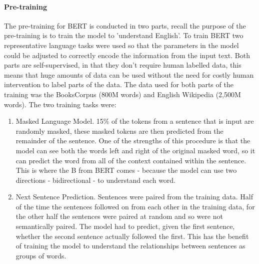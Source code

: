 \paragraph{Pre-training} The pre-training for BERT is conducted in two parts, recall the purpose of the pre-training is to train the model to 'understand English'. To train BERT two representative language tasks were used so that the parameters in the model could be adjusted to correctly encode the information from the input text. Both parts are self-supervised, in that they don't require human labelled data, this means that huge amounts of data can be used without the need for costly human intervention to label parts of the data. The data used for both parts of the training was the BooksCorpus (800M words) and English Wikipedia (2,500M words). The two training tasks were:

\begin{enumerate}
    \item Masked Language Model. 15\% of the tokens from a sentence that is input are randomly masked, these masked tokens are then predicted from the remainder of the sentence. One of the strengths of this procedure is that the model can see both the words left and right of the original masked word, so it can predict the word from all of the context contained within the sentence. This is where the B from BERT comes - because the model can use two directions - bidirectional - to understand each word. 
    
    \item Next Sentence Prediction. Sentences were paired from the training data. Half of the time the sentences followed on from each other in the training data, for the other half the sentences were paired at random and so were not semantically paired.  The model had to predict, given the first sentence, whether the second sentence actually followed the first. This has the benefit of training the model to understand the relationships between sentences as groups of words.
    
\end{enumerate}

